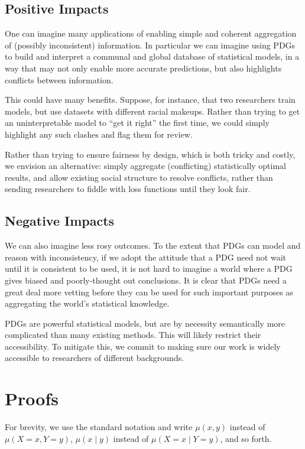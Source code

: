 \documentclass[letterpaper]{article} %
\theoremstyle{plain}
\theoremstyle{definition}
\theoremstyle{remark}
\newif\ifappendix
\begin{document}
\subsection{Positive Impacts}
One can imagine many applications of enabling simple and coherent
aggregation of (possibly inconsistent) information. In particular we
can imagine using PDGs to build and interpret a communal and global
database of statistical models, in a way that may not only enable more
accurate predictions, but also highlights conflicts between
information.

This could have many benefits. Suppose, for instance, that two researchers train
models, but use datasets with different racial makeups. Rather than trying to
get an uninterpretable model to ``get it right'' the first time, we could simply
highlight any
such clashes and flag them for review.

Rather than trying to ensure fairness by design, which is both tricky and
costly, we envision an alternative: simply aggregate (conflicting) statistically
optimal results, and allow existing social structure to resolve conflicts,
rather than sending researchers to fiddle with loss functions until they look fair. 


\subsection{Negative Impacts}

We can also imagine less rosy outcomes. To the extent that PDGs can
model and reason with inconsistency, if we adopt the attitude that a PDG need
not wait until it is consistent to be used, it is not hard to imagine a world
where a PDG gives biased and
poorly-thought out conclusions. It is clear that PDGs need a great deal more
vetting before they can be used for such important purposes as
aggregating the world's statistical knowledge.

PDGs are powerful statistical models, but are by necessity semantically more
complicated than many existing methods. This will likely restrict their
accessibility. To mitigate this, we commit to making sure our work is widely
accessible to researchers of different
backgrounds.
\fi
\ifappendix
\appendix
\clearpage
\onecolumn
\section{Proofs} \label{sec:proofs}
		For brevity, we use the standard notation and write $\mu(x, y)$
	instead of $\mu(X \!=\! x, Y \!=\! y)$, $\mu(x \mid y)$ instead of
	$\mu(X \!=\! x\mid Y \!=\! y)$, and so forth.
\end{document}
